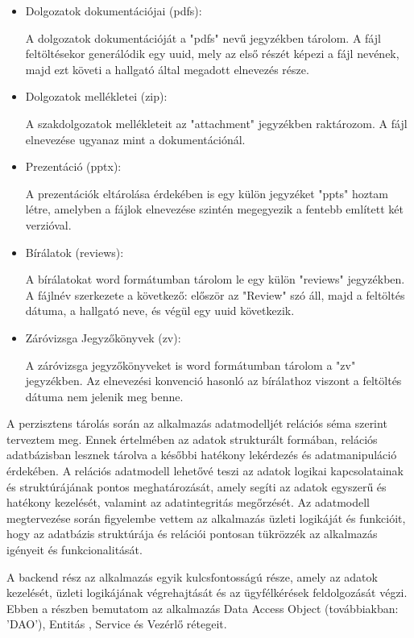 \begin{itemize}

\item{Dolgozatok dokumentációjai (pdfs):}

A dolgozatok dokumentációját a "pdfs" nevű jegyzékben tárolom. 
A fájl feltöltésekor generálódik egy uuid, mely az első részét képezi a fájl nevének, majd ezt követi a hallgató által megadott elnevezés része.

\item{Dolgozatok mellékletei (zip):}

A szakdolgozatok mellékleteit az "attachment" jegyzékben raktározom. A fájl elnevezése ugyanaz mint a dokumentációnál.

\item{Prezentáció (pptx):}

A prezentációk eltárolása érdekében is egy külön jegyzéket "ppts" hoztam létre, amelyben a fájlok elnevezése szintén megegyezik a fentebb említett két verzióval.

\item{Bírálatok (reviews):}

A bírálatokat word formátumban tárolom le egy külön "reviews" jegyzékben. A fájlnév szerkezete a következő: először az "Review" szó áll, majd a feltöltés dátuma, a hallgató neve, és végül egy uuid következik.


\item{Záróvizsga Jegyzőkönyvek (zv):}

A záróvizsga jegyzőkönyveket is word formátumban tárolom a "zv" jegyzékben. Az elnevezési konvenció hasonló az bírálathoz viszont a feltöltés dátuma nem jelenik meg benne.

\end{itemize}

A perzisztens tárolás során az alkalmazás adatmodelljét relációs séma szerint terveztem meg. Ennek értelmében az adatok strukturált formában, relációs adatbázisban lesznek tárolva a későbbi hatékony lekérdezés és adatmanipuláció érdekében. A relációs adatmodell lehetővé teszi az adatok logikai kapcsolatainak és struktúrájának pontos meghatározását, amely segíti az adatok egyszerű és hatékony kezelését, valamint az adatintegritás megőrzését. Az adatmodell megtervezése során figyelembe vettem az alkalmazás üzleti logikáját és funkcióit, hogy az adatbázis struktúrája és relációi pontosan tükrözzék az alkalmazás igényeit és funkcionalitását.


A backend rész az alkalmazás egyik kulcsfontosságú része, amely az adatok kezelését, üzleti logikájának végrehajtását és az ügyfélkérések feldolgozását végzi. Ebben a részben bemutatom az alkalmazás Data Access Object (továbbiakban: 'DAO'), Entitás , Service és Vezérlő rétegeit.

